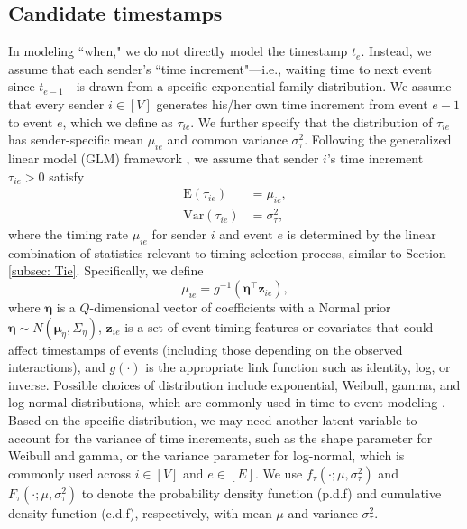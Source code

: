 \documentclass[ba]{imsart}
\numberwithin{equation}{section}
\theoremstyle{plain}
\begin{document}
	\subsection{Candidate timestamps}\label{subsec:Time}	
	 In modeling ``when," we do not directly model the timestamp $t_e$. Instead, we assume that each sender's ``time increment"---i.e., waiting time to next event since $t_{e-1}$---is drawn from a specific exponential family distribution. We assume that every sender $i \in [V]$ generates his/her own time increment from event $e-1$ to event $e$, which we define as $\tau_{ie}$. We further specify that the distribution of $\tau_{ie}$ has sender-specific mean $\mu_{ie}$ and common variance $\sigma_\tau^2$. Following the generalized linear model (GLM) framework \citep{nelder1972generalized}, we assume that sender $i$'s time increment $\tau_{ie} > 0$ satisfy~
	\begin{equation}
		\begin{aligned}
\mbox{E}(\tau_{ie}) &= \mu_{ie},\\
\mbox{Var}(\tau_{ie}) &= \sigma_\tau^2,
		\end{aligned}
	\end{equation}
	where the timing rate $\mu_{ie}$ for sender $i$ and event $e$ is determined by the linear combination of statistics relevant to timing selection process, similar to Section \ref{subsec: Tie}. Specifically, we define
	\begin{equation}
		\mu_{ie} = g^{-1}(\boldsymbol{\eta}^\top \boldsymbol{z}_{ie}),
	\end{equation}
	where $\boldsymbol{\eta}$ is a $Q$-dimensional vector of coefficients with a Normal prior $\boldsymbol{\eta} \sim N(\boldsymbol{\mu}_\eta,\Sigma_\eta)$, $\boldsymbol{z}_{ie}$ is a set of event timing features or covariates that could affect timestamps of events (including those depending on the observed interactions), and $g(\cdot)$ is the appropriate link function such as identity, log, or inverse. Possible choices of distribution include exponential, Weibull, gamma, and log-normal distributions, which are commonly used in time-to-event modeling \citep{rao2000applied,rizopoulos2012joint}. Based on the specific distribution, we may need another latent variable to account for the variance of time increments, such as the shape parameter for Weibull and gamma, or the variance parameter for log-normal, which is commonly used across $i\in [V]$ and $e \in [E]$. We use $f_\tau(\cdot; \mu, \sigma_\tau^2)$ and $F_\tau(\cdot; \mu, \sigma_\tau^2)$ to denote the probability density function (p.d.f) and cumulative density function (c.d.f), respectively, with mean $\mu$ and variance $\sigma_\tau^2$. 
\end{document}
